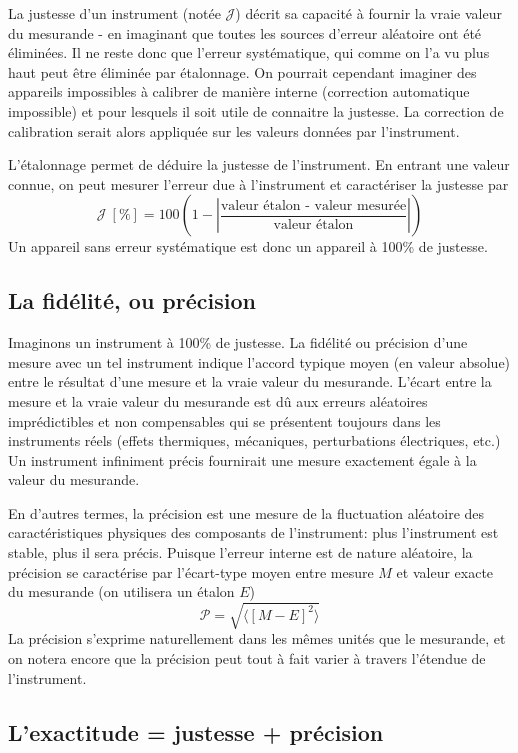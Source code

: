 La justesse d'un instrument (notée $\mathcal{J}$) décrit sa capacité à fournir la vraie valeur du mesurande - en imaginant que toutes les sources d'erreur aléatoire ont été éliminées. Il ne reste donc que l'erreur systématique, qui comme on l'a vu plus haut peut être éliminée par étalonnage. On pourrait cependant imaginer des appareils impossibles à calibrer de manière interne (correction automatique impossible) et pour lesquels il soit utile de connaitre la justesse. La correction de calibration serait alors appliquée sur les valeurs données par l'instrument.

L'étalonnage permet de déduire la justesse de l'instrument. En entrant une valeur connue, on peut mesurer l'erreur due à l'instrument et caractériser la justesse par
$$
\mathcal{J}\ [\%]=100\left(1-\left|\frac{\text{valeur étalon - valeur mesurée}}{\text{valeur étalon}}\right|\right)
$$
Un appareil sans erreur systématique est donc un appareil à 100\% de justesse.

\subsection{La fidélité, ou précision}

Imaginons un instrument à 100\% de justesse. La fidélité ou précision d'une mesure avec un tel instrument indique l'accord typique moyen (en valeur absolue) entre le résultat d'une mesure et la vraie valeur du mesurande. L'écart entre la mesure et la vraie valeur du mesurande est dû aux erreurs aléatoires imprédictibles et non compensables qui se présentent toujours dans les instruments réels (effets thermiques, mécaniques, perturbations électriques, etc.) Un instrument infiniment précis fournirait une mesure exactement égale à la valeur du mesurande.

En d'autres termes, la précision est une mesure de la fluctuation aléatoire des caractéristiques physiques des composants de l'instrument: plus l'instrument est stable, plus il sera précis. Puisque l'erreur interne est de nature aléatoire, la précision se caractérise par l'écart-type moyen entre mesure $M$ et valeur exacte du mesurande (on utilisera un étalon $E$)
$$
\mathcal{P}=\sqrt{\langle[M-E]^2\rangle}
$$
La précision s'exprime naturellement dans les mêmes unités que le mesurande, et on notera encore que la précision peut tout à fait varier à travers l'étendue de l'instrument.

\subsection{L'exactitude = justesse + précision}

